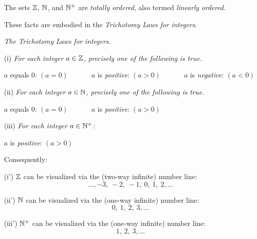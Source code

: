  
 


The sets $\mathbb{Z}$, $\mathbb{N}$, and $\mathbb{N}^+$ are {\em totally ordered}, also termed {\em linearly ordered}.

\smallskip

 

These facts are embodied in the {\em Trichotomy Laws for integers}.

\medskip

{\it The Trichotomy Laws for integers}.

\smallskip

(i)
{\it For each integer $a \in \mathbb{Z}$, precisely one of the following is true.}

\hspace*{.2in} $a$ equals $0$: $(a=0)$ \ \ \ \ \ \
 $a$ is {\em positive}: $(a>0)$ \ \ \ \ \ \
 $a$ is {\em negative}: $(a<0)$

\smallskip

(ii)
{\it For each integer $a \in \mathbb{N}$, precisely one of the following is true.}

\hspace*{.2in} $a$ equals $0$: $(a=0)$ \ \ \ \ \ \ $a$ is {\em positive}: $(a>0)$

\smallskip

(iii)
{\it For each integer $a \in \mathbb{N}^+$:}

\hspace*{.2in} $a$ is {\em positive}: $(a>0)$

\bigskip

Consequently:
\smallskip


(i')
$\mathbb{Z}$ can be visualized via the (two-way infinite) number line:
\[ \ldots, -3, \  -2, \ -1, \ 0, \ 1,\  2, \ldots \]

\smallskip

(ii')
$\mathbb{N}$ can be visualized via the (one-way infinite) number line:
\[  0, \ 1, \ 2, \ 3, \ldots \]

\smallskip

(iii')
$\mathbb{N}^+$ can be visualized via the (one-way infinite) number line:
\[  1, \ 2, \ 3, \ldots \]

\medskip

